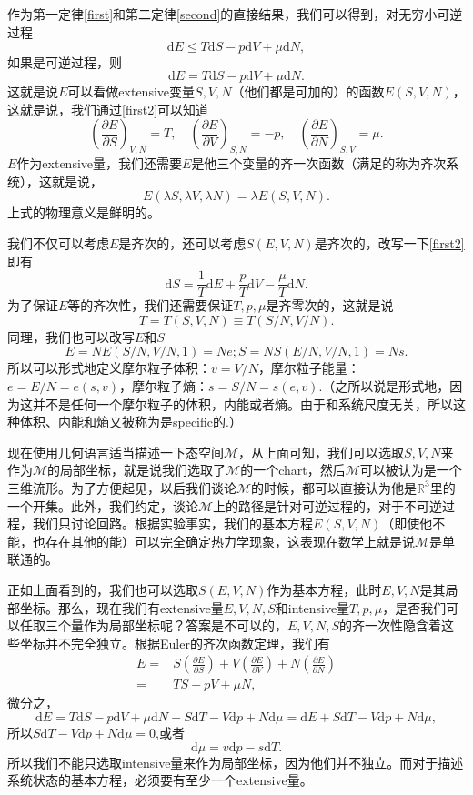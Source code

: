 \documentclass[10pt]{book}
\theoremstyle{plain}%
\begin{document}
\subsection{}
作为第一定律\eqref{first}和第二定律\eqref{second}的直接结果，我们可以得到，对无穷小可逆过程
\[
\mathrm{d}E\leq T\mathrm{d}S-p\mathrm{d}V+\mu\mathrm{d}N,
\]
如果是可逆过程，则
\begin{equation}
\label{first2}
\mathrm{d}E=T\mathrm{d}S-p\mathrm{d}V+\mu\mathrm{d}N.
\end{equation}
这就是说$E$可以看做extensive变量$S,V,N$（他们都是可加的）的函数$E(S,V,N)$，这就是说，我们通过\eqref{first2}可以知道
\[
\left(\frac{\partial E}{\partial S}\right)_{V,N}=T,\quad \left(\frac{\partial E}{\partial V}\right)_{S,N}=-p,\quad \left(\frac{\partial E}{\partial N}\right)_{S,V}=\mu.
\]
$E$作为extensive量，我们还需要$E$是他三个变量的齐一次函数（满足的称为齐次系统），这就是说，
\[
	E(\lambda S,\lambda V, \lambda N)=\lambda E(S,V,N).
\]
上式的物理意义是鲜明的。

我们不仅可以考虑$E$是齐次的，还可以考虑$S(E,V,N)$是齐次的，改写一下\eqref{first2}即有
\[
\mathrm{d}S=\frac{1}{T}\mathrm{d}E+\frac{p}{T}\mathrm{d}V-\frac{\mu}{T}\mathrm{d}N.
\]
为了保证$E$等的齐次性，我们还需要保证$T,p,\mu$是齐零次的，这就是说\[
T=T(S,V,N)\equiv T(S/N,V/N).
\]
同理，我们也可以改写$E$和$S$
\[
E=NE(S/N,V/N,1)=Ne;S=NS(E/N,V/N,1)=Ns.
\]
所以可以形式地定义摩尔粒子体积：$v=V/N$，摩尔粒子能量：$e=E/N=e(s,v)$，摩尔粒子熵：$s=S/N=s(e,v)$.（之所以说是形式地，因为这并不是任何一个摩尔粒子的体积，内能或者熵。由于和系统尺度无关，所以这种体积、内能和熵又被称为是specific的.）

现在使用几何语言适当描述一下态空间$\mathcal{M}$，从上面可知，我们可以选取$S,V,N$来作为$\mathcal{M}$的局部坐标，就是说我们选取了$\mathcal{M}$的一个chart，然后$\mathcal{M}$可以被认为是一个三维流形。为了方便起见，以后我们谈论$\mathcal{M}$的时候，都可以直接认为他是$\mathbb{R}^3$里的一个开集。此外，我们约定，谈论$\mathcal{M}$上的路径是针对可逆过程的，对于不可逆过程，我们只讨论回路。根据实验事实，我们的基本方程$E(S,V,N)$（即使他不能，也存在其他的能）可以完全确定热力学现象，这表现在数学上就是说$\mathcal{M}$是单联通的。

正如上面看到的，我们也可以选取$S(E,V,N)$作为基本方程，此时$E,V,N$是其局部坐标。那么，现在我们有extensive量$E,V,N,S$和intensive量$T,p,\mu$，是否我们可以任取三个量作为局部坐标呢？答案是不可以的，$E,V,N,S$的齐一次性隐含着这些坐标并不完全独立。根据Euler的齐次函数定理，我们有
\begin{align*}
E=&S\left(\frac{\partial E}{\partial S}\right)+V\left(\frac{\partial E}{\partial V}\right)+N\left(\frac{\partial E}{\partial N}\right)\\
=&TS-pV+\mu N,
\end{align*}
微分之，
\[
\mathrm{d}E=T\mathrm{d}S-p\mathrm{d}V+\mu \mathrm{d}N+S\mathrm{d}T-V\mathrm{d}p+N\mathrm{d}\mu=\mathrm{d}E+S\mathrm{d}T-V\mathrm{d}p+N\mathrm{d}\mu,
\]
所以$S\mathrm{d}T-V\mathrm{d}p+N\mathrm{d}\mu=0$,或者
\[
\mathrm{d}\mu=v\mathrm{d}p-s\mathrm{d}T.
\]
所以我们不能只选取intensive量来作为局部坐标，因为他们并不独立。而对于描述系统状态的基本方程，必须要有至少一个extensive量。
\end{document}

